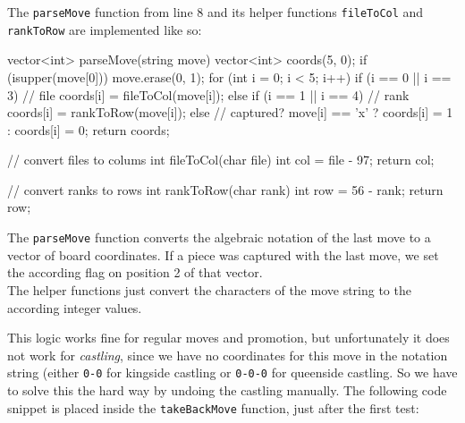 The \texttt{parseMove} function from line 8 and its helper functions \texttt{fileToCol} and
\texttt{rankToRow} are implemented like so:

\begin{cpp}
vector<int> parseMove(string move) {
  vector<int> coords(5, 0);
  if (isupper(move[0])) move.erase(0, 1);
  for (int i = 0; i < 5; i++) {
    if (i == 0 || i == 3) { // file
      coords[i] = fileToCol(move[i]);
    } else if (i == 1 || i == 4) { // rank
      coords[i] = rankToRow(move[i]);
    } else { // captured?
      move[i] == 'x' ? coords[i] = 1 : coords[i] = 0;
    }
  }
  return coords;
}

// convert files to colums
int fileToCol(char file) {
  int col = file - 97;
  return col;
}

// convert ranks to rows
int rankToRow(char rank) {
  int row = 56 - rank;
  return row;
}
\end{cpp}

The \texttt{parseMove} function converts the algebraic notation of the last move to a vector of
board coordinates.
If a piece was captured with the last move, we set the according flag on position 2 of that vector.\\
The helper functions just convert the characters of the move string to the according integer values.

This logic works fine for regular moves and promotion, but unfortunately it does not work for
\emph{castling}, since we have no coordinates for this move in the notation string (either
\texttt{0-0} for kingside castling or \texttt{0-0-0} for queenside castling.
So we have to solve this the hard way by undoing the castling manually.
The following code snippet is placed inside the \texttt{takeBackMove} function, just after the first test:

